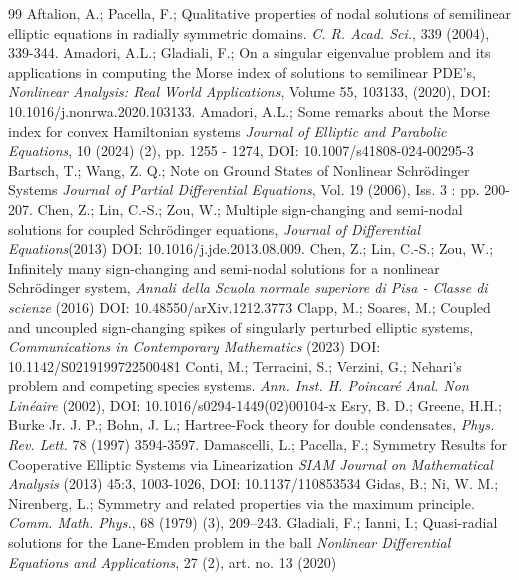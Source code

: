 \documentclass[10pt,a4paper]{amsart}
\numberwithin{equation}{section}
\begin{document}
\begin{thebibliography}{99}
 Aftalion, A.; Pacella, F.;
 Qualitative properties of nodal solutions of semilinear
 elliptic equations in radially symmetric domains.
 \emph{C. R. Acad. Sci.}, 339 (2004), 339-344.
 Amadori, A.L.; Gladiali, F.;
 On a singular eigenvalue problem and its applications in computing the Morse index of solutions to semilinear PDE’s,
 \emph{Nonlinear Analysis: Real World Applications},
 Volume 55,  103133, (2020),
 DOI: 10.1016/j.nonrwa.2020.103133.
 Amadori, A.L.;
 Some remarks about the Morse index for convex Hamiltonian systems
\emph{Journal of Elliptic and Parabolic Equations}, 10  (2024) (2), pp. 1255 - 1274,
 DOI: 10.1007/s41808-024-00295-3
 Bartsch, T.; Wang, Z. Q.;
 Note on Ground States of Nonlinear Schr\"{o}dinger Systems
\emph{Journal of Partial Differential Equations}, Vol. 19 (2006), Iss. 3 : pp. 200-207.
 Chen, Z.; Lin, C.-S.; Zou, W.;
Multiple sign-changing and semi-nodal solutions for coupled Schr\"{o}dinger equations,
\emph{Journal of Differential Equations}(2013)
DOI: 10.1016/j.jde.2013.08.009.
 Chen, Z.; Lin, C.-S.; Zou, W.;
Infinitely many sign-changing and semi-nodal solutions for a nonlinear Schr\"{o}dinger
system, \emph{Annali della Scuola normale superiore di Pisa - Classe di scienze} (2016)
DOI: 10.48550/arXiv.1212.3773
 Clapp, M.; Soares, M.;
Coupled and uncoupled sign-changing spikes of singularly perturbed elliptic systems,
 \emph{Communications in Contemporary Mathematics} (2023) DOI: 10.1142/S0219199722500481
 Conti, M.; Terracini, S.;  Verzini, G.;
 Nehari's problem and competing species systems.
\emph{Ann. Inst. H. Poincar\'e Anal. Non Lin\'eaire} (2002),
DOI: 10.1016/s0294-1449(02)00104-x
 Esry, B. D.; Greene, H.H.; Burke Jr. J. P.; Bohn, J. L.;
Hartree-Fock theory for double condensates, \emph{Phys. Rev. Lett.} 78 (1997) 3594-3597.
 Damascelli, L.; Pacella, F.;
Symmetry Results for Cooperative Elliptic Systems via Linearization
\emph{SIAM Journal on Mathematical Analysis} (2013) 45:3, 1003-1026,
DOI: 10.1137/110853534
 Gidas, B.; Ni, W. M.; Nirenberg, L.;
Symmetry and related properties via the maximum
principle. \emph{Comm. Math. Phys.}, 68 (1979) (3), 209--243.
 Gladiali, F.; Ianni, I.;
Quasi-radial solutions for the Lane-Emden problem in the ball
\emph{Nonlinear Differential Equations and Applications}, 27 (2), art. no. 13 (2020)

\end{thebibliography}
\end{document}
